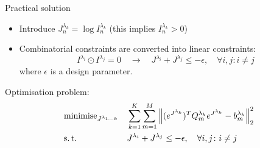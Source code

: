 \documentclass[../main.tex]{subfiles}
\begin{document}
\begin{frame}[t]{Practical solution}

\begin{itemize}
\item Introduce $J^{\lambda_k}_n = \log{I^{\lambda_k}_n}$ (this implies $I^{\lambda_k}_n > 0$)
\item Combinatorial constraints are converted into linear constraints:
    \begin{equation*}
  I^{\lambda_i} \odot I^{\lambda_j} = 0 \quad \rightarrow \quad J^{\lambda_i} + J^{\lambda_j} \le -\epsilon, \quad \forall i, j \colon i \ne j
    \end{equation*}
    where $\epsilon$ is a design parameter. 
\end{itemize}

Optimisation problem:
\begin{equation*}
\begin{aligned}
& \operatorname{minimise}_{J^{\lambda_{1\ldots k}}} 
& & \sum_{k=1}^K \sum_{m=1}^M \Big\| (e^{J^{\lambda_{k}}})^T Q^{\lambda_{k}}_m  e^{J^{\lambda_{k}}} - b^{\lambda_{k}}_m \Big\|_2^2 \\
& \operatorname{s.t.}
& & J^{\lambda_i} + J^{\lambda_j} \le -\epsilon, \quad \forall i, j \colon i \ne j \\
\end{aligned}
\label{general_problem_formulation3}
\end{equation*}

\end{frame}
\end{document}
